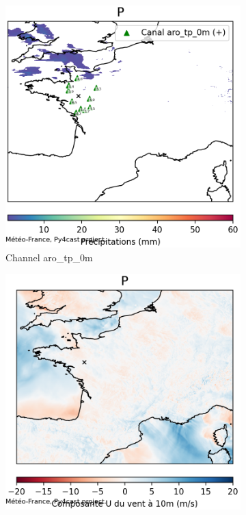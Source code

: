 \begin{figure}[h]
    \centering
    \begin{subfigure}[b]{0.49\textwidth}
        \includegraphics[width=\textwidth]{Images/titan_rain_anchors/nov-18/2023111800_feature_aro_tp_0m.png}
        \caption{Channel aro\_tp\_0m}
    \end{subfigure}
    \hfill
    \begin{subfigure}[b]{0.49\textwidth}
        \includegraphics[width=\textwidth]{Images/titan_rain_anchors/nov-18/2023111800_feature_aro_u10_10m.png}

\end{subfigure}
\end{figure}
